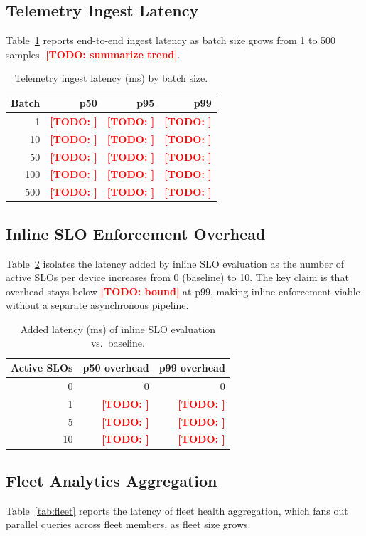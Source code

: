 \documentclass[review,12pt]{elsarticle}
\newcommand{\TODO}[1]{\textcolor{red}{\textbf{[TODO: #1]}}}
\begin{document}
\subsection{Telemetry Ingest Latency}
Table~\ref{tab:ingest} reports end-to-end ingest latency as batch size grows
from 1 to 500 samples. \TODO{summarize trend}.

\begin{table}[h]
\centering
\caption{Telemetry ingest latency (ms) by batch size.}
\label{tab:ingest}
\begin{tabular}{rrrr}
\toprule
Batch & p50 & p95 & p99 \\
\midrule
1   & \TODO{} & \TODO{} & \TODO{} \\
10  & \TODO{} & \TODO{} & \TODO{} \\
50  & \TODO{} & \TODO{} & \TODO{} \\
100 & \TODO{} & \TODO{} & \TODO{} \\
500 & \TODO{} & \TODO{} & \TODO{} \\
\bottomrule
\end{tabular}
\end{table}

\subsection{Inline SLO Enforcement Overhead}
Table~\ref{tab:slo} isolates the latency added by inline SLO evaluation as the
number of active SLOs per device increases from 0 (baseline) to 10. The key
claim is that overhead stays below \TODO{bound} at p99, making inline
enforcement viable without a separate asynchronous pipeline.

\begin{table}[h]
\centering
\caption{Added latency (ms) of inline SLO evaluation vs.\ baseline.}
\label{tab:slo}
\begin{tabular}{rrr}
\toprule
Active SLOs & p50 overhead & p99 overhead \\
\midrule
0  & 0 & 0 \\
1  & \TODO{} & \TODO{} \\
5  & \TODO{} & \TODO{} \\
10 & \TODO{} & \TODO{} \\
\bottomrule
\end{tabular}
\end{table}

\subsection{Fleet Analytics Aggregation}
Table~\ref{tab:fleet} reports the latency of fleet health aggregation, which
fans out parallel queries across fleet members, as fleet size grows.
\end{document}
